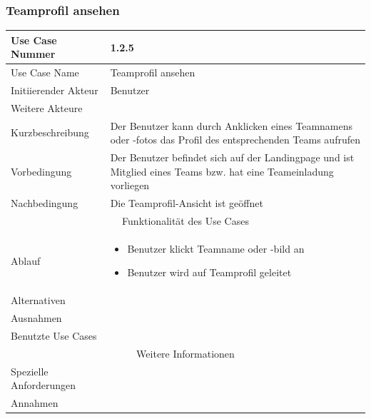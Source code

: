 \documentclass[10pt,a4paper]{article}
\begin{document}
		\subsubsection{Teamprofil ansehen}
		\begin{tabularx}{\textwidth}{|l|X|}
			\hline Use Case Nummer & 1.2.5 \\ 
			\hline Use Case Name & Teamprofil ansehen \\ 
			\hline Initiierender Akteur & Benutzer \\
			\hline Weitere Akteure & \\
			\hline Kurzbeschreibung & Der Benutzer kann durch Anklicken eines Teamnamens oder -fotos das Profil des entsprechenden Teams aufrufen \\
			\hline Vorbedingung & Der Benutzer befindet sich auf der Landingpage und ist Mitglied eines Teams bzw. hat eine Teameinladung vorliegen \\
			\hline Nachbedingung & Die Teamprofil-Ansicht ist geöffnet \\
			\hline \multicolumn{2}{|c|}{Funktionalität des Use Cases}\\
			\hline Ablauf & \begin{itemize}
				\item Benutzer klickt Teamname oder -bild an
				\item Benutzer wird auf Teamprofil geleitet
			\end{itemize} \\
			\hline Alternativen & \\
			\hline Ausnahmen & \\
			\hline Benutzte Use Cases & \\
			\hline \multicolumn{2}{|c|}{Weitere Informationen} \\
			\hline Spezielle Anforderungen & \\
			\hline Annahmen & \\
			\hline
		\end{tabularx}
				
\end{document}
